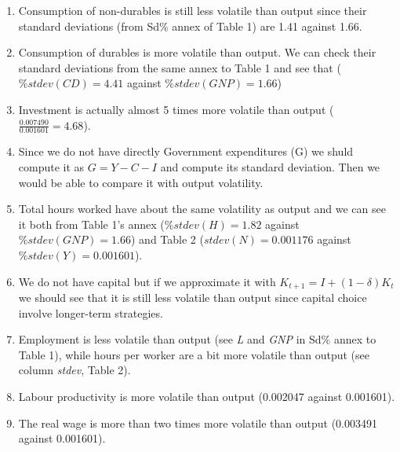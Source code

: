 \documentclass[a4paper,10pt]{report}
\begin{document}
\begin{enumerate}
  \item Consumption of non-durables is still less volatile than output since their standard deviations (from Sd\% annex of Table 1) are 1.41 against 1.66.
  \item Consumption of durables is more volatile than output. We can check their standard deviations from the same annex to Table 1 and see that ($\%stdev(CD) = 4.41$ against $\%stdev(GNP) = 1.66$)
  \item Investment is actually almost 5 times more volatile than output ($\frac{0.007490}{0.001601} = 4.68$).
  \item Since we do not have directly Government expenditures (G) we shuld compute it as $G = Y-C-I$ and compute its standard deviation. Then we would be able to compare it with output volatility.
  \item Total hours worked have about the same volatility as output and we can see it both from Table 1's annex ($\%stdev(H) = 1.82$ against $\%stdev(GNP) = 1.66$) and Table 2 ($stdev(N) = 0.001176$ against $\%stdev(Y) = 0.001601$).
  \item We do not have capital but if we approximate it with $K_{t+1} = I + (1-\delta)K_{t}$ we should see that it is still less volatile than output since capital choice involve longer-term strategies.
  \item Employment is less volatile than output (see \textit{L} and \textit{GNP} in Sd\% annex to Table 1), while hours per worker are a bit more volatile than output (see column \textit{stdev}, Table 2).
  \item Labour productivity is more volatile than output (0.002047 against 0.001601).
  \item The real wage is more than two times more volatile than output (0.003491 against 0.001601).
\end{enumerate}


\newpage
\printbibliography
\end{document}

